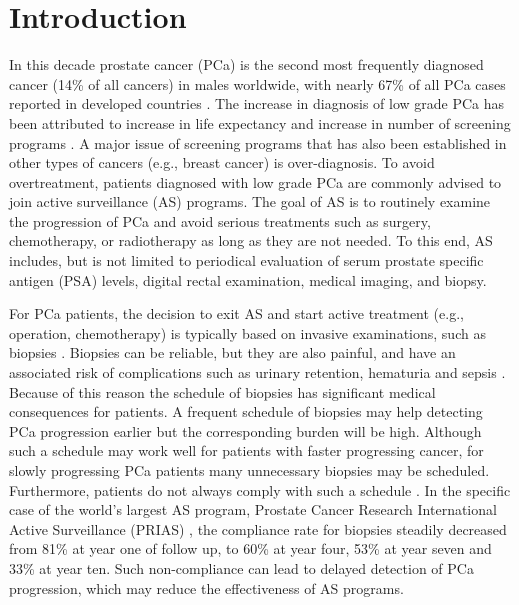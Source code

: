 \section{Introduction}
\label{sec : introduction}
In this decade prostate cancer (PCa) is the second most frequently diagnosed cancer (14\% of all cancers) in males worldwide, with nearly 67\% of all PCa cases reported in developed countries \citep{GlobalCancerStats2012}. The increase in diagnosis of low grade PCa has been attributed to increase in life expectancy and increase in number of screening programs \citep{potoskyPSAcancer}. A major issue of screening programs that has also been established in other types of cancers (e.g., breast cancer) is over-diagnosis.  To avoid overtreatment, patients diagnosed with low grade PCa are commonly advised to join active surveillance (AS) programs. The goal of AS is to routinely examine the progression of PCa and avoid serious treatments such as surgery, chemotherapy, or radiotherapy as long as they are not needed. To this end, AS includes, but is not limited to periodical evaluation of serum prostate specific antigen (PSA) levels, digital rectal examination, medical imaging, and biopsy.

For PCa patients, the decision to exit AS and start active treatment (e.g., operation, chemotherapy) is typically based on invasive examinations, such as biopsies \citep{bokhorst2016decade}. Biopsies can be reliable, but they are also painful, and have an associated risk of complications such as urinary retention, hematuria and sepsis \citep{loeb2013systematic}. Because of this reason the schedule of  biopsies has significant medical consequences for patients. A frequent schedule of biopsies may help detecting PCa progression earlier but the corresponding burden will be high. Although such a schedule may work well for patients with faster progressing cancer, for slowly progressing PCa patients many unnecessary biopsies may be scheduled. Furthermore, patients do not always comply with such a schedule \citep{bokhorst2015compliance}. In the specific case of the world's largest AS program, Prostate Cancer Research International Active Surveillance (PRIAS) \citep{bokhorst2016decade}, the compliance rate for biopsies steadily decreased from 81\% at year one of follow up, to 60\% at year four, 53\% at year seven and 33\% at year ten. Such non-compliance can lead to delayed detection of PCa progression, which may reduce the effectiveness of AS programs.

